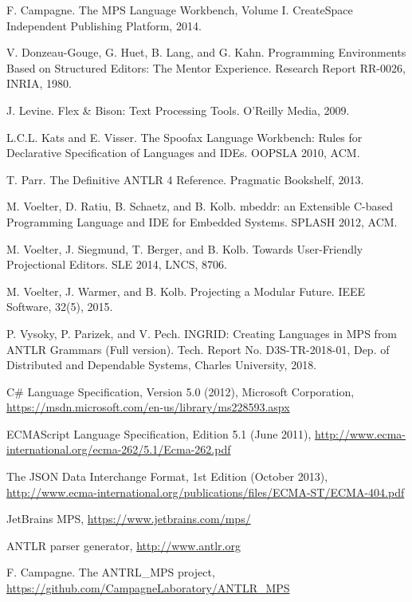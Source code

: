 \documentclass[sigplan,10pt,preprint]{acmart}
\begin{document}
\begin{thebibliography}{}

 F. Campagne. The MPS Language Workbench, Volume I. CreateSpace Independent Publishing Platform, 2014.

 V. Donzeau-Gouge, G. Huet, B. Lang, and G. Kahn. Programming Environments Based on Structured Editors: The Mentor Experience. Research Report RR-0026, INRIA, 1980.

 J. Levine. Flex \& Bison: Text Processing Tools. O'Reilly Media, 2009.

 L.C.L. Kats and E. Visser. The Spoofax Language Workbench: Rules for Declarative Specification of Languages and IDEs. OOPSLA 2010, ACM.

 T. Parr. The Definitive ANTLR 4 Reference. Pragmatic Bookshelf, 2013.

 M. Voelter, D. Ratiu, B. Schaetz, and B. Kolb. mbeddr: an Extensible C-based Programming Language and IDE for Embedded Systems. SPLASH 2012, ACM.

 M. Voelter, J. Siegmund, T. Berger, and B. Kolb. Towards User-Friendly Projectional Editors. SLE 2014, LNCS, 8706.

 M. Voelter, J. Warmer, and B. Kolb. Projecting a Modular Future. IEEE Software, 32(5), 2015.

 P. Vysoky, P. Parizek, and V. Pech. INGRID: Creating Languages in MPS from ANTLR Grammars (Full version). Tech. Report No. D3S-TR-2018-01, Dep. of Distributed and Dependable Systems, Charles University, 2018.

 C\# Language Specification, Version 5.0 (2012), Microsoft Corporation, \url{https://msdn.microsoft.com/en-us/library/ms228593.aspx}

 ECMAScript Language Specification, Edition 5.1 (June 2011), \url{http://www.ecma-international.org/ecma-262/5.1/Ecma-262.pdf}

 The JSON Data Interchange Format, 1st Edition (October 2013), \url{http://www.ecma-international.org/publications/files/ECMA-ST/ECMA-404.pdf}

 JetBrains MPS, \url{https://www.jetbrains.com/mps/}

 ANTLR parser generator, \url{http://www.antlr.org}

 F. Campagne. The ANTRL{\_}MPS project, \url{https://github.com/CampagneLaboratory/ANTLR_MPS}


\end{thebibliography}
\end{document}
